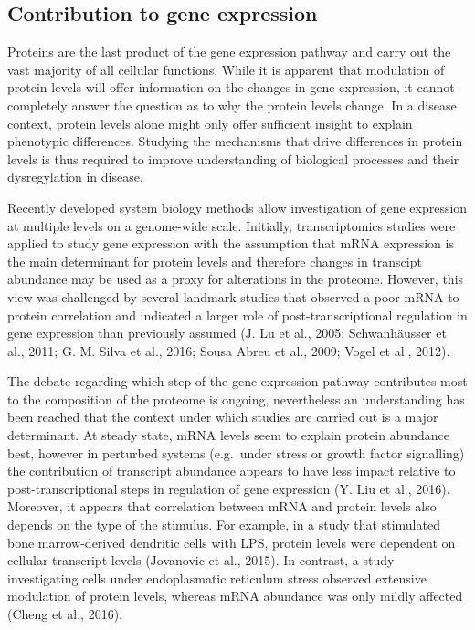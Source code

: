 \documentclass[12pt,openany]{book}
\begin{document}
\subsection{Contribution to gene expression} Proteins are the last
product of the gene expression pathway and carry out the vast majority
of all cellular functions. While it is apparent that modulation of
protein levels will offer information on the changes in gene expression,
it cannot completely answer the question as to why the protein levels
change. In a disease context, protein levels alone might only offer
sufficient insight to explain phenotypic differences. Studying the
mechanisms that drive differences in protein levels is thus required to
improve understanding of biological processes and their dysregylation in
disease.

Recently developed system biology methods allow investigation of gene
expression at multiple levels on a genome-wide scale. Initially,
transcriptomics studies were applied to study gene expression with the
assumption that mRNA expression is the main determinant for protein
levels and therefore changes in transcipt abundance may be used as a
proxy for alterations in the proteome. However, this view was challenged
by several landmark studies that observed a poor mRNA to protein
correlation and indicated a larger role of post-transcriptional
regulation in gene expression than previously assumed (J. Lu et al.,
2005; Schwanhäusser et al., 2011; G. M. Silva et al., 2016; Sousa Abreu
et al., 2009; Vogel et al., 2012).

The debate regarding which step of the gene expression pathway
contributes most to the composition of the proteome is ongoing,
nevertheless an understanding has been reached that the context under
which studies are carried out is a major determinant. At steady state,
mRNA levels seem to explain protein abundance best, however in perturbed
systems (e.g.~under stress or growth factor signalling) the contribution
of transcript abundance appears to have less impact relative to
post-transcriptional steps in regulation of gene expression (Y. Liu et
al., 2016). Moreover, it appears that correlation between mRNA and
protein levels also depends on the type of the stimulus. For example, in
a study that stimulated bone marrow-derived dendritic cells with LPS,
protein levels were dependent on cellular transcript levels (Jovanovic
et al., 2015). In contrast, a study investigating cells under
endoplasmatic reticulum stress observed extensive modulation of protein
levels, whereas mRNA abundance was only mildly affected (Cheng et al.,
2016).
\end{document}
